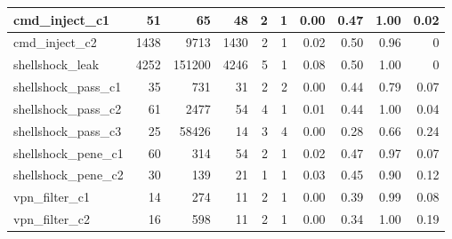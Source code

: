\begin{table*}[!hbt]
{\begin{tabular}{|l|r|r|r|r|r|r|r|r|r|}
cmd\_inject\_c1      & 51                   & 65                & 48          & 2                & 1       & 0.00                      & 0.47           & 1.00                         & 0.02                 \\ \hline
cmd\_inject\_c2      & 1438                 & 9713              & 1430        & 2                & 1       & 0.02                      & 0.50           & 0.96                         & 0                    \\ \hline
shellshock\_leak        & 4252                 & 151200            & 4246        & 5                & 1       & 0.08                      & 0.50           & 1.00                         & 0                    \\ \hline
shellshock\_pass\_c1 & 35                   & 731               & 31          & 2                & 2       & 0.00                      & 0.44           & 0.79                         & 0.07                 \\ \hline
shellshock\_pass\_c2 & 61                   & 2477              & 54          & 4                & 1       & 0.01                      & 0.44           & 1.00                         & 0.04                 \\ \hline
shellshock\_pass\_c3 & 25                   & 58426             & 14          & 3                & 4       & 0.00                      & 0.28           & 0.66                         & 0.24                 \\ \hline
shellshock\_pene\_c1 & 60                   & 314               & 54          & 2                & 1       & 0.02                      & 0.47           & 0.97                         & 0.07                 \\ \hline
shellshock\_pene\_c2 & 30                   & 139               & 21          & 1                & 1       & 0.03                      & 0.45           & 0.90                         & 0.12                 \\ \hline
vpn\_filter\_c1      & 14                   & 274               & 11          & 2                & 1       & 0.00                      & 0.39           & 0.99                         & 0.08                 \\ \hline
vpn\_filter\_c2      & 16                   & 598               & 11          & 2                & 1       & 0.00                      & 0.34           & 1.00                         & 0.19                 \\ \hline
\end{tabular}
}
\label{tab:summary}
\end{table*}